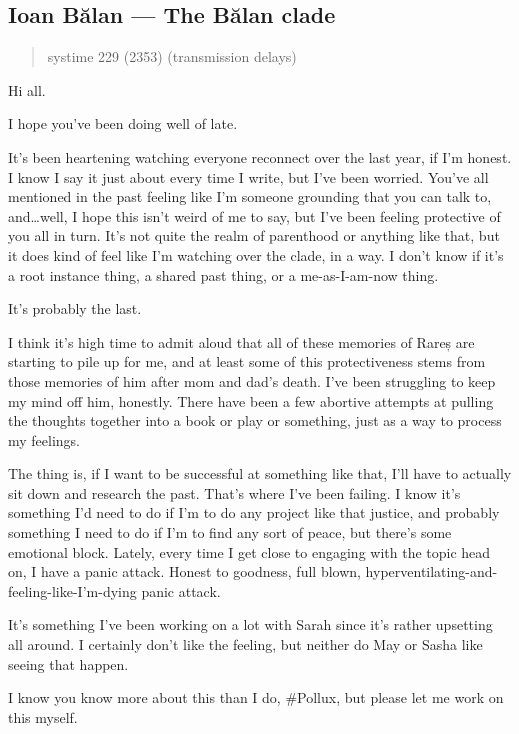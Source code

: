 \hypertarget{ioan-bux103lan-the-bux103lan-clade}{%
\subsection{Ioan Bălan — The Bălan clade}\label{ioan-bux103lan-the-bux103lan-clade}}

\begin{quote}
systime 229 (2353) (transmission delays)
\end{quote}

Hi all.

I hope you've been doing well of late.

It's been heartening watching everyone reconnect over the last year, if I'm honest. I know I say it just about every time I write, but I've been worried. You've all mentioned in the past feeling like I'm someone grounding that you can talk to, and\ldots{}well, I hope this isn't weird of me to say, but I've been feeling protective of you all in turn. It's not quite the realm of parenthood or anything like that, but it does kind of feel like I'm watching over the clade, in a way. I don't know if it's a root instance thing, a shared past thing, or a me-as-I-am-now thing.

It's probably the last.

I think it's high time to admit aloud that all of these memories of Rareș are starting to pile up for me, and at least some of this protectiveness stems from those memories of him after mom and dad's death. I've been struggling to keep my mind off him, honestly. There have been a few abortive attempts at pulling the thoughts together into a book or play or something, just as a way to process my feelings.

The thing is, if I want to be successful at something like that, I'll have to actually sit down and research the past. That's where I've been failing. I know it's something I'd need to do if I'm to do any project like that justice, and probably something I need to do if I'm to find any sort of peace, but there's some emotional block. Lately, every time I get close to engaging with the topic head on, I have a panic attack. Honest to goodness, full blown, hyperventilating-and-feeling-like-I'm-dying panic attack.

It's something I've been working on a lot with Sarah since it's rather upsetting all around. I certainly don't like the feeling, but neither do May or Sasha like seeing that happen.

I know you know more about this than I do, \#Pollux, but please let me work on this myself.

